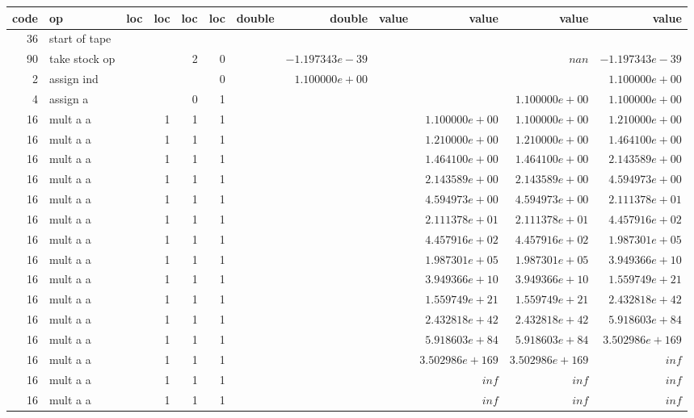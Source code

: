 \documentclass{article}
\begin{document}
\tiny
\begin{tabular}{|r|l|r|r|r|r||r|r||r|r|r|r|} \hline 
 code & op & loc & loc & loc & loc & double & double & value & value & value & value \\ \hline 
 36 & start of tape & & & & & & & & & &  \\ \hline 
90 & take stock op & & & 2 & 0 & &$ -1.197343e-39 $& & &$ nan $&$ -1.197343e-39 $\\ \hline 
2 & assign ind & & & & 0 & &$ 1.100000e+00 $& & & &$ 1.100000e+00 $\\ \hline 
4 & assign a & & & 0 & 1 & & & & &$ 1.100000e+00 $&$ 1.100000e+00 $\\ \hline 
16 & mult a a & & 1 & 1 & 1 & & & &$ 1.100000e+00 $&$ 1.100000e+00 $&$ 1.210000e+00 $\\ \hline 
16 & mult a a & & 1 & 1 & 1 & & & &$ 1.210000e+00 $&$ 1.210000e+00 $&$ 1.464100e+00 $\\ \hline 
16 & mult a a & & 1 & 1 & 1 & & & &$ 1.464100e+00 $&$ 1.464100e+00 $&$ 2.143589e+00 $\\ \hline 
16 & mult a a & & 1 & 1 & 1 & & & &$ 2.143589e+00 $&$ 2.143589e+00 $&$ 4.594973e+00 $\\ \hline 
16 & mult a a & & 1 & 1 & 1 & & & &$ 4.594973e+00 $&$ 4.594973e+00 $&$ 2.111378e+01 $\\ \hline 
16 & mult a a & & 1 & 1 & 1 & & & &$ 2.111378e+01 $&$ 2.111378e+01 $&$ 4.457916e+02 $\\ \hline 
16 & mult a a & & 1 & 1 & 1 & & & &$ 4.457916e+02 $&$ 4.457916e+02 $&$ 1.987301e+05 $\\ \hline 
16 & mult a a & & 1 & 1 & 1 & & & &$ 1.987301e+05 $&$ 1.987301e+05 $&$ 3.949366e+10 $\\ \hline 
16 & mult a a & & 1 & 1 & 1 & & & &$ 3.949366e+10 $&$ 3.949366e+10 $&$ 1.559749e+21 $\\ \hline 
16 & mult a a & & 1 & 1 & 1 & & & &$ 1.559749e+21 $&$ 1.559749e+21 $&$ 2.432818e+42 $\\ \hline 
16 & mult a a & & 1 & 1 & 1 & & & &$ 2.432818e+42 $&$ 2.432818e+42 $&$ 5.918603e+84 $\\ \hline 
16 & mult a a & & 1 & 1 & 1 & & & &$ 5.918603e+84 $&$ 5.918603e+84 $&$ 3.502986e+169 $\\ \hline 
16 & mult a a & & 1 & 1 & 1 & & & &$ 3.502986e+169 $&$ 3.502986e+169 $&$ inf $\\ \hline 
16 & mult a a & & 1 & 1 & 1 & & & &$ inf $&$ inf $&$ inf $\\ \hline 
16 & mult a a & & 1 & 1 & 1 & & & &$ inf $&$ inf $&$ inf $\\ \hline 

\end{tabular}
\end{document}
